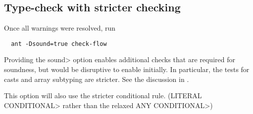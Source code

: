 \subsection{Type-check with stricter checking}

Once all warnings were resolved, run 

\begin{Verbatim}
  ant -Dsound=true check-flow
\end{Verbatim}

\noindent
Providing the \<sound> option enables additional checks that are
required for soundness, but would be disruptive to enable initially.
In particular, the tests for casts and array subtyping are stricter.
See the discussion in .

This option will also use the stricter conditional rule. (\<LITERAL
\flowsto{} CONDITIONAL> rather than the relaxed \<ANY \flowsto{} CONDITIONAL>)


